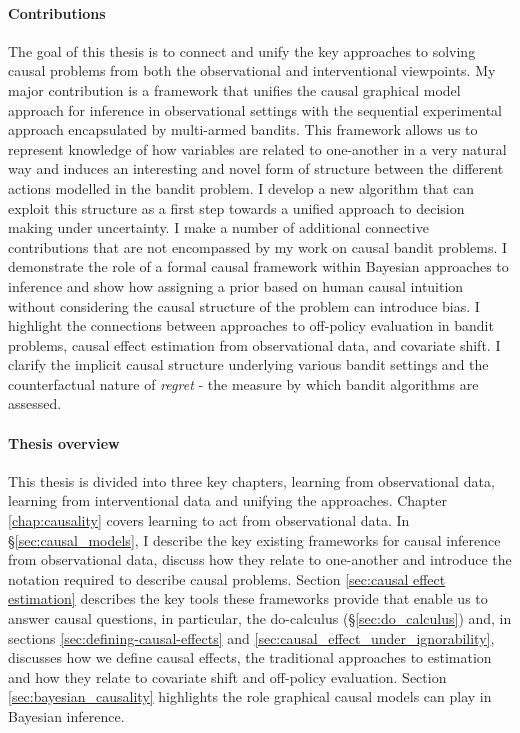 \documentclass[11pt,a4paper,twoside]{report}
\theoremstyle{plain}
\theoremstyle{definition}
\begin{document}
\paragraph{Contributions} The goal of this thesis is to connect and unify the key approaches to solving causal problems from both the observational and interventional viewpoints. My major contribution is a framework that unifies the causal graphical model approach for inference in observational settings with the sequential experimental approach encapsulated by multi-armed bandits. This framework allows us to represent knowledge of how variables are related to one-another in a very natural way and induces an interesting and novel form of structure between the different actions modelled in the bandit problem. I develop a new algorithm that can exploit this structure as a first step towards a unified approach to decision making under uncertainty. 
I make a number of additional connective contributions that are not encompassed by my work on causal bandit problems. I demonstrate the role of a formal causal framework within Bayesian approaches to inference and show how assigning a prior based on human causal intuition without considering the causal structure of the problem can introduce bias. I highlight the connections between approaches to off-policy evaluation in bandit problems, causal effect estimation from observational data, and covariate shift. I clarify the implicit causal structure underlying various bandit settings and the counterfactual nature of \emph{regret} - the measure by which bandit algorithms are assessed.

\paragraph{Thesis overview} This thesis is divided into three key chapters, learning from observational data, learning from interventional data and unifying the approaches. Chapter \ref{chap:causality} covers learning to act from observational data. In \S\ref{sec:causal_models}, I describe the key existing frameworks for causal inference from observational data, discuss how they relate to one-another and introduce the notation required to describe causal problems. Section \ref{sec:causal effect estimation} describes the key tools these frameworks provide that enable us to answer causal questions, in particular, the do-calculus (\S\ref{sec:do_calculus}) and, in sections \ref{sec:defining-causal-effects} and \ref{sec:causal_effect_under_ignorability}, discusses how we define causal effects, the traditional approaches to estimation and how they relate to covariate shift and off-policy evaluation. Section \ref{sec:bayesian_causality} highlights the role graphical causal models can play in Bayesian inference. 
\end{document}
